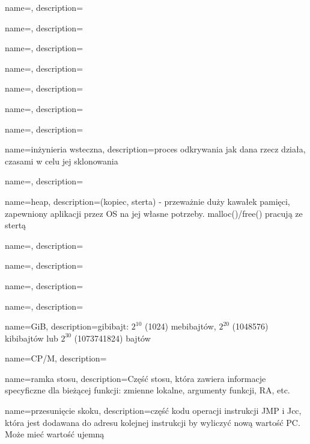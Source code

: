 {
  name={\PLph},
  description={\PLph}
}

{
  name={\PLph},
  description={\PLph}
}

{
  name={\PLph},
  description={\PLph}
}

{
  name={\PLph},
  description={\PLph}
}

{
  name={\PLph},
  description={\PLph}
}

{
  name={\PLph},
  description={\PLph}
}

{
  name={\PLph},
  description={\PLph}
}

{
  name={inżynieria wsteczna},
  description={proces odkrywania jak dana rzecz działa, czasami w celu jej sklonowania}
}

{
  name={\PLph},
  description={\PLph}
}

{
  name={heap},
  description={(kopiec, sterta) - przeważnie duży kawałek pamięci, zapewniony aplikacji przez \ac{OS} na jej własne potrzeby. malloc()/free() pracują ze stertą}
}

{
  name={\PLph},
  description={\PLph}
}

{
  name={\PLph},
  description={\PLph}
}

{
  name={\PLph},
  description={\PLph}
}

{
  name={\PLph},
  description={\PLph}
}

{
  name=GiB,
  description={gibibajt: $2^{10}$ (1024) mebibajtów, $2^{20}$ (1048576) kibibajtów lub $2^{30}$ (1073741824) bajtów}
}

{
  name=CP/M,
  description={\PLph}
}

{
  name=ramka stosu,
  description={Część stosu, która zawiera informacje specyficzne dla bieżącej funkcji:
  zmienne lokalne, argumenty funkcji, \ac{RA}, etc.}
}

{
  name=przesunięcie skoku,
  description={część kodu operacji instrukcji JMP i Jcc,
  która jest dodawana do adresu
  kolejnej instrukcji by wyliczyć nową wartość \ac{PC}. Może mieć wartość ujemną}
}

